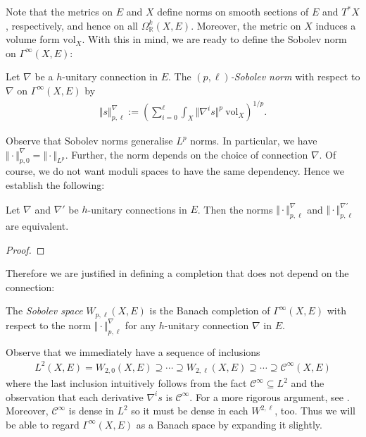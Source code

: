 \documentclass[12pt]{ociamthesis}  %
\begin{document}
Note that the metrics on $E$ and $X$ define norms on smooth sections
of $E$ and $T^*X$, respectively, and hence on all
$\Omega^k_{\mathbb{R}}(X,E)$.
Moreover, the metric on $X$ induces a volume form $\text{vol}_X$.
With this in mind, we are ready to define the Sobolev norm on
$\Gamma^\infty(X,E)$:

\begin{definition}
  Let $\nabla$ be a $h$-unitary connection in $E$.
  The \emph{$(p,\ell)$-Sobolev norm} with respect to $\nabla$ on
  $\Gamma^\infty(X,E)$ by
  \begin{align*}
    \Vert s\Vert_{p,\ell}^\nabla := \left(
    \sum_{i=0}^\ell \int_X \Vert \nabla^i s \Vert^p\:\text{vol}_X
    \right)^{1/p}.
  \end{align*}
\end{definition}

Observe that Sobolev norms generalise $L^p$ norms. In particular,
we have $\Vert\cdot\Vert^\nabla_{p,0} = \Vert\cdot\Vert_{L^p}$.
Further, the norm depends on the choice of connection $\nabla$. Of
course, we do not want moduli spaces to have the same dependency. Hence
we establish the following:
\begin{lemma}
  Let $\nabla$ and $\nabla'$ be $h$-unitary connections in $E$. Then the
  norms $\Vert\cdot\Vert_{p,\ell}^\nabla$ and
  $\Vert\cdot\Vert_{p,\ell}^{\nabla'}$ are equivalent.
  \begin{proof}
    \missingproof
  \end{proof}
\end{lemma}

Therefore we are justified in defining a completion that does not depend
on the connection:

\begin{definition}
  The \emph{Sobolev space} $W_{p,\ell}(X,E)$ is the Banach completion of
  $\Gamma^\infty(X,E)$ with respect to the norm
  $\Vert\cdot\Vert_{p,\ell}^\nabla$ for any $h$-unitary connection
  $\nabla$ in $E$.
\end{definition}

Observe that we immediately have a sequence of inclusions
\begin{align*}
  L^2(X,E) =
  W_{2,0}(X,E) \supseteq
  \cdots \supseteq
  W_{2,\ell}(X,E) \supseteq
  \cdots
  \supseteq
  \mathscr C^\infty(X,E)
\end{align*}
where the last inclusion intuitively follows from the fact
$\mathscr C^\infty \subseteq L^2$ and the observation that each derivative
$\nabla^i s$ is $\mathscr C^\infty$. For a more rigorous argument, see
\cite[Corollary 3.8.3]{bc2009}.
Moreover, $\mathscr C^\infty$ is dense in $L^2$ so it must be dense in each
$W^{2,\ell}$, too. Thus we will be able to regard $\Gamma^\infty(X,E)$
as a Banach space by expanding it slightly.
\end{document}
